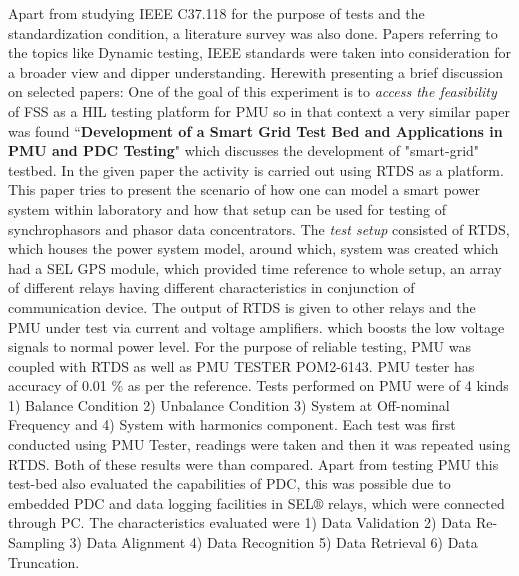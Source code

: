 Apart from studying IEEE C37.118 for the purpose of tests and the standardization condition, a literature survey was also done. Papers referring to the topics like Dynamic testing, IEEE standards were taken into consideration for a broader view and dipper understanding. Herewith presenting a brief discussion on selected papers:
One of the goal of this experiment is to \textit{access the feasibility} of FSS as a HIL testing platform for PMU so in that context a very similar paper was found ``\textbf{Development of a Smart Grid Test Bed and Applications in PMU and PDC Testing}"  which discusses the development of "smart-grid" testbed. In the given paper the activity is carried out using RTDS as a platform. This paper tries to present the scenario of how one can model a smart power system within laboratory and how that setup can be used for testing of synchrophasors and phasor data concentrators. The \textit{test setup} consisted of RTDS, which houses the power system model, around which, system was created which had a SEL GPS module, which provided time reference to whole setup, an array of different relays having different characteristics in conjunction of communication device. The output of RTDS is given to other relays and the PMU under test via current and voltage amplifiers. which boosts the low voltage signals to normal power level. For the purpose of reliable testing, PMU was coupled with RTDS as well as PMU TESTER POM2-6143\cite{Paper:saugata}. PMU tester has accuracy of 0.01 \% as per the reference. Tests performed on PMU were of 4 kinds 1) Balance Condition 2) Unbalance Condition 3) System at Off-nominal Frequency and 4) System with harmonics component. Each test was first conducted using PMU Tester, readings were taken and then it was repeated using RTDS. Both of these results were than compared. Apart from testing PMU this test-bed also evaluated the capabilities of PDC, this was possible due to embedded PDC and data logging facilities in SEL$\circledR$ relays, which were connected through PC. The characteristics evaluated were 1) Data Validation 2) Data Re-Sampling 3) Data Alignment 4) Data Recognition 5) Data Retrieval 6) Data Truncation.


